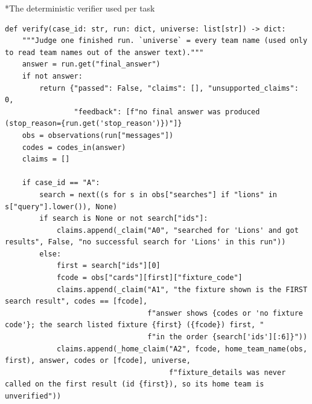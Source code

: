 \documentclass[11pt]{article}
\makeatletter
\renewcommand\subsection{\@startsection{subsection}{2}{\z@}{-2.2ex \@plus -1ex \@minus -.2ex}{0.8ex \@plus.2ex}{\normalfont\fontsize{12}{14.5}\selectfont\bfseries}}
\makeatother
\begin{document}
\subsection*{The deterministic verifier used per task}
\begingroup\lstset{basicstyle=\ttfamily\tiny}
\begin{lstlisting}
def verify(case_id: str, run: dict, universe: list[str]) -> dict:
    """Judge one finished run. `universe` = every team name (used only to read team names out of the answer text)."""
    answer = run.get("final_answer")
    if not answer:
        return {"passed": False, "claims": [], "unsupported_claims": 0,
                "feedback": [f"no final answer was produced (stop_reason={run.get('stop_reason')})"]}
    obs = observations(run["messages"])
    codes = codes_in(answer)
    claims = []

    if case_id == "A":
        search = next((s for s in obs["searches"] if "lions" in s["query"].lower()), None)
        if search is None or not search["ids"]:
            claims.append(_claim("A0", "searched for 'Lions' and got results", False, "no successful search for 'Lions' in this run"))
        else:
            first = search["ids"][0]
            fcode = obs["cards"][first]["fixture_code"]
            claims.append(_claim("A1", "the fixture shown is the FIRST search result", codes == [fcode],
                                 f"answer shows {codes or 'no fixture code'}; the search listed fixture {first} ({fcode}) first, "
                                 f"in the order {search['ids'][:6]}"))
            claims.append(_home_claim("A2", fcode, home_team_name(obs, first), answer, codes or [fcode], universe,
                                      f"fixture_details was never called on the first result (id {first}), so its home team is unverified"))


\end{lstlisting}
\end{document}
